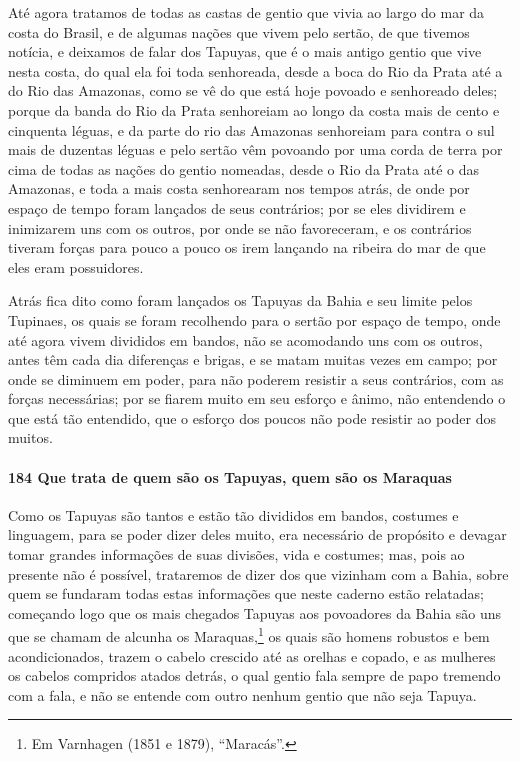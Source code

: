 Até agora tratamos de todas as castas de gentio que vivia ao largo do mar da costa do
Brasil, e de algumas nações que vivem pelo sertão, de que tivemos notícia, e deixamos de
falar dos Tapuyas, que é o mais antigo gentio que vive nesta costa, do qual ela foi toda
senhoreada, desde a boca do Rio da Prata até a do Rio das Amazonas, como se vê do que está
hoje povoado e senhoreado deles; porque da banda do Rio da Prata senhoreiam ao longo da
costa mais de cento e cinquenta léguas, e da parte do rio das Amazonas senhoreiam para
contra o sul mais de duzentas léguas e pelo sertão vêm povoando por uma corda de terra por
cima de todas as nações do gentio nomeadas, desde o Rio da Prata até o das Amazonas, e
toda a mais costa senhorearam nos tempos atrás, de onde por espaço de tempo foram lançados
de seus contrários; por se eles dividirem e inimizarem uns com os outros, por onde se não
favoreceram, e os contrários tiveram forças para pouco a pouco os irem lançando na ribeira
do mar de que eles eram possuidores.

Atrás fica dito como foram lançados os Tapuyas da Bahia e seu limite pelos Tupinaes, os
quais se foram recolhendo para o sertão por espaço de tempo, onde até agora vivem
divididos em bandos, não se acomodando uns com os outros, antes têm cada dia diferenças e
brigas, e se matam muitas vezes em campo; por onde se diminuem em poder, para não poderem
resistir a seus contrários, com as forças necessárias; por se fiarem muito em seu esforço
e ânimo, não entendendo o que está tão entendido, que o esforço dos poucos não pode
resistir ao poder dos muitos.

\paragraph{184 Que trata de quem são os Tapuyas, quem são os Maraquas}

Como os Tapuyas são tantos e estão tão divididos em bandos, costumes e linguagem, para se
poder dizer deles muito, era necessário de propósito e devagar tomar grandes informações
de suas divisões, vida e costumes; mas, pois ao presente não é possível, trataremos de
dizer dos que vizinham com a Bahia, sobre quem se fundaram todas estas informações que
neste caderno estão relatadas; começando logo que os mais chegados Tapuyas aos povoadores
da Bahia são uns que se chamam de alcunha os Maraquas,\footnote{ Em Varnhagen (1851 e
1879), ``Maracás''.} os quais são homens robustos e bem acondicionados, trazem o cabelo
crescido até as orelhas e copado, e as mulheres os cabelos compridos atados detrás, o qual
gentio fala sempre de papo tremendo com a fala, e não se entende com outro nenhum gentio
que não seja Tapuya.

